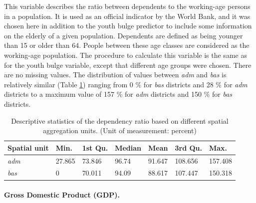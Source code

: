 \documentclass[a4paper,11pt]{article}
\begin{document}
This variable describes the ratio between dependents to the working-age persons in a
population. It is used as an official indicator by the World Bank, and it was
chosen here in addition to the youth bulge predictor to include some information
on the elderly of a given population. Dependents are defined as being younger
than 15 or older than 64. People between these age classes are considered as
the working-age population. The procedure to calculate this variable is the same
as for the youth bulge variable, except that different age groups were chosen.
There are no missing values. The distribution of values between \emph{adm} and \emph{bas}
is relatively similar (Table \ref{tab:02-data-dep}) ranging from 0 \% for
\emph{bas} districts and 28 \% for \emph{adm} districts to a maximum value of 157 \% for \emph{adm}
districts and 150 \% for \emph{bas} districts.
\begin{table}[H]

\caption[Descriptive statistics of the dependency ratio.]{\label{tab:02-data-dep}Descriptive statistics of the dependency ratio based on different spatial
               aggregation units. (Unit of measurement: percent)}
\centering
\fontsize{10}{12}\selectfont
\begin{tabular}[t]{lllllll}
\toprule
Spatial unit & Min. & 1st Qu. & Median & Mean & 3rd Qu. & Max.\\
\midrule
\textit{adm} & 27.865 & 73.846 & 96.74 & 91.647 & 108.656 & 157.408\\
\textit{bas} & 0 & 70.011 & 94.09 & 88.617 & 107.447 & 150.318\\
\bottomrule
\end{tabular}
\end{table}
\hypertarget{gross-domestic-product-gdp.}{%
\paragraph{Gross Domestic Product (GDP).}\label{gross-domestic-product-gdp.}}
\end{document}
